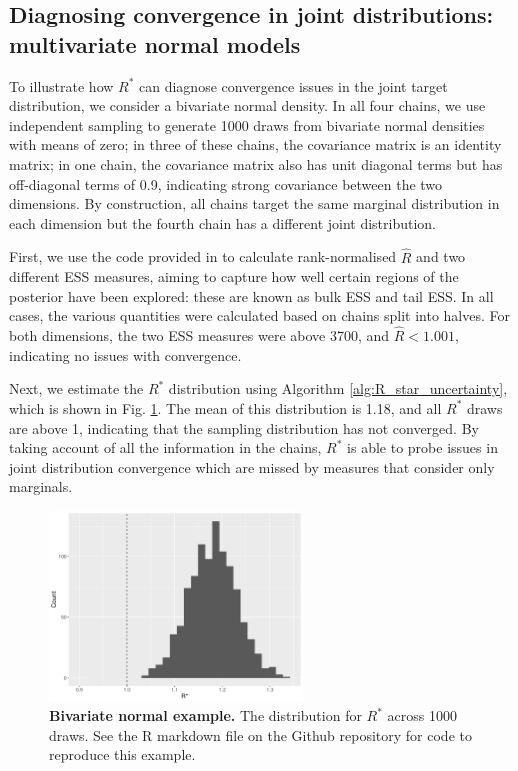 \documentclass{article}
\begin{document}
\subsection{Diagnosing convergence in joint distributions: multivariate normal models}\label{sec:multivariate_normal}
To illustrate how $R^*$ can diagnose convergence issues in the joint target distribution, we consider a bivariate normal density. In all four chains, we use independent sampling to generate 1000 draws from bivariate normal densities with means of zero; in three of these chains, the covariance matrix is an identity matrix; in one chain, the covariance matrix also has unit diagonal terms but has off-diagonal terms of 0.9, indicating strong covariance between the two dimensions. By construction, all chains target the same marginal distribution in each dimension but the fourth chain has a different joint distribution.

First, we use the code provided in \cite{vehtari2019rank} to calculate rank-normalised $\widehat{R}$ and two different ESS measures, aiming to capture how well certain regions of the posterior have been explored: these are known as bulk ESS and tail ESS. In all cases, the various quantities were calculated based on chains split into halves. For both dimensions, the two ESS measures were above 3700, and $\widehat{R}<1.001$, indicating no issues with convergence.

Next, we estimate the $R^*$ distribution using Algorithm \ref{alg:R_star_uncertainty}, which is shown in Fig. \ref{fig:bivariate}. The mean of this distribution is 1.18, and all $R^*$ draws are above 1, indicating that the sampling distribution has not converged. By taking account of all the information in the chains, $R^*$ is able to probe issues in joint distribution convergence which are missed by measures that consider only marginals.

\begin{figure}[!htb]
	\centerline{\includegraphics[width=0.6\textwidth]{../output/bivariate.pdf}}
	\caption{\textbf{Bivariate normal example.} The distribution for $R^*$ across 1000 draws. See the R markdown file on the Github repository for code to reproduce this example.}
	\label{fig:bivariate}
\end{figure}
\end{document}
